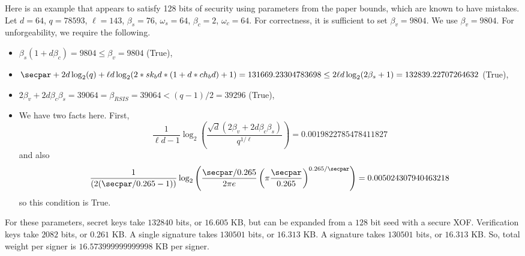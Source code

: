 \begin{example}
Here is an example that appears to satisfy 128 bits of security using parameters from the paper bounds, which are known to have mistakes.
Let $d = 64$, $q = 78593$, $\ell = 143$, $\beta_s = 76$, $\omega_s = 64$, $\beta_c = 2$, $\omega_c = 64$.
For correctness, it is sufficient to set $\beta_v = 9804$. We use $\beta_v = 9804$.
For unforgeability, we require the following.
\begin{itemize}
\item $\beta_s(1+d\beta_c) = 9804\leq \beta_v = 9804$ (True),
\item $\secpar + 2d \log_2(q) + \ell d \log_2(2*sk_bd*(1+d*ch_bd)+1)= 131669.23304783698\leq 2\ell d \log_2(2\beta_s + 1) = 132839.22707264632$ (True),
\item $2\beta_v + 2d\beta_c \beta_s = 39064 = \beta_{RSIS} = 39064< (q-1)/2 = 39296$ (True),
\item We have two facts here. First, \[\frac{1}{\ell d - 1}\log_2\left(\frac{\sqrt{d}(2\beta_v + 2d\beta_c \beta_s)}{q^{1/\ell}}\right) = 0.0019822785478411827\]and also \[\frac{1}{(2(\secpar/0.265 - 1))}\log_2\left(\frac{\secpar/0.265}{2\pi e}\left(\pi \frac{\secpar}{0.265}\right)^{0.265/\secpar}\right) = 0.005024307940463218\]so this condition is True.
\end{itemize}
For these parameters, secret keys take $132840$ bits, or $16.605$ KB, but can be expanded from a $128$ bit seed with a secure XOF.  Verification keys take $2082$ bits, or $0.261$ KB. A single signature takes $130501$ bits, or $16.313$ KB.  A signature takes $130501$ bits, or $16.313$ KB.  So, total weight per signer is $16.573999999999998$ KB per signer.
\end{example}

